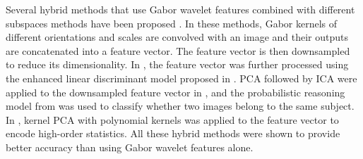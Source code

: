 \documentclass[conference]{IEEEtran}
\begin{document}
Several hybrid methods that use Gabor wavelet features combined with different subspaces methods have been proposed \cite{liu2002gabor,liu2003independent,liu2004gabor}. In these methods, Gabor kernels of different orientations and scales are convolved with an image and their outputs are concatenated into a feature vector. The feature vector is then downsampled to reduce its dimensionality. In \cite{liu2002gabor}, the feature vector was further processed using the enhanced linear discriminant model proposed in \cite{liu2000robust}. PCA followed by ICA were applied to the downsampled feature vector in \cite{liu2003independent}, and the probabilistic reasoning model from \cite{liu2000robust} was used to classify whether two images belong to the same subject. In \cite{liu2004gabor}, kernel PCA with polynomial kernels was applied to the feature vector to encode high-order statistics. All these hybrid methods were shown to provide better accuracy than using Gabor wavelet features alone.
\end{document}
